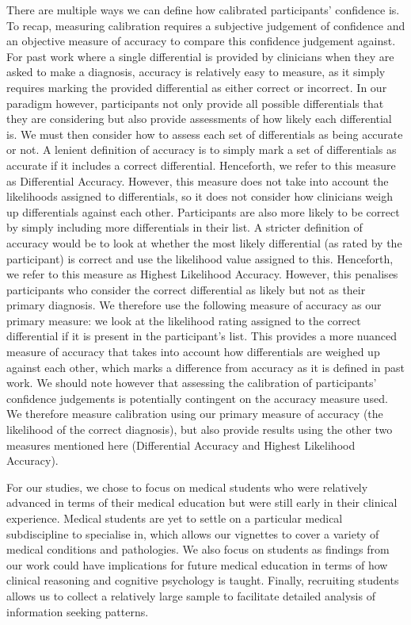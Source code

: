 \documentclass[a4paper, nobind]{templates/ociamthesis}
\begin{document}
\hfill\break
There are multiple ways we can define how calibrated participants' confidence is. To recap, measuring calibration requires a subjective judgement of confidence and an objective measure of accuracy to compare this confidence judgement against. For past work where a single differential is provided by clinicians when they are asked to make a diagnosis, accuracy is relatively easy to measure, as it simply requires marking the provided differential as either correct or incorrect. In our paradigm however, participants not only provide all possible differentials that they are considering but also provide assessments of how likely each differential is. We must then consider how to assess each set of differentials as being accurate or not. A lenient definition of accuracy is to simply mark a set of differentials as accurate if it includes a correct differential. Henceforth, we refer to this measure as Differential Accuracy. However, this measure does not take into account the likelihoods assigned to differentials, so it does not consider how clinicians weigh up differentials against each other. Participants are also more likely to be correct by simply including more differentials in their list. A stricter definition of accuracy would be to look at whether the most likely differential (as rated by the participant) is correct and use the likelihood value assigned to this. Henceforth, we refer to this measure as Highest Likelihood Accuracy. However, this penalises participants who consider the correct differential as likely but not as their primary diagnosis. We therefore use the following measure of accuracy as our primary measure: we look at the likelihood rating assigned to the correct differential if it is present in the participant's list. This provides a more nuanced measure of accuracy that takes into account how differentials are weighed up against each other, which marks a difference from accuracy as it is defined in past work. We should note however that assessing the calibration of participants' confidence judgements is potentially contingent on the accuracy measure used. We therefore measure calibration using our primary measure of accuracy (the likelihood of the correct diagnosis), but also provide results using the other two measures mentioned here (Differential Accuracy and Highest Likelihood Accuracy).

\hfill\break
For our studies, we chose to focus on medical students who were relatively advanced in terms of their medical education but were still early in their clinical experience. Medical students are yet to settle on a particular medical subdiscipline to specialise in, which allows our vignettes to cover a variety of medical conditions and pathologies. We also focus on students as findings from our work could have implications for future medical education in terms of how clinical reasoning and cognitive psychology is taught. Finally, recruiting students allows us to collect a relatively large sample to facilitate detailed analysis of information seeking patterns.\\
\end{document}
